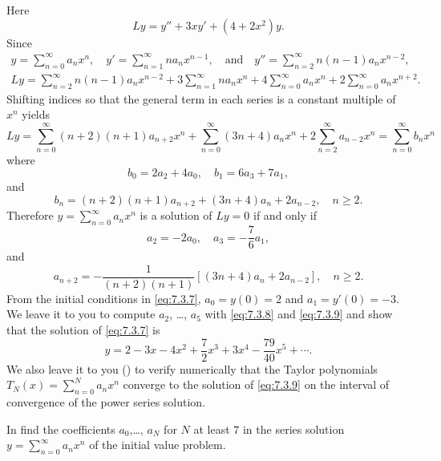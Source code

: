 \begin{solution}
Here
\[
Ly=y''+3xy'+(4+2x^2)y.
\]
Since
\begin{gather*}
y=\sum^\infty_{n=0} a_nx^n,\quad y'=\sum^\infty_{n=1} n
a_nx^{n-1},\quad\text{and}\quad
y''=\sum^\infty_{n=2}n(n-1)a_nx^{n-2},
\\
Ly=\sum^\infty_{n=2}n(n-1)a_nx^{n-2}
+3\sum^\infty_{n=1}na_nx^n+4\sum^\infty_{n=0}a_nx^n+2\sum^\infty_{n=0}
a_nx^{n+2}.
\end{gather*}
Shifting indices so  that the general term in each
series is a constant multiple of $x^n$ yields
\[
Ly=\sum^\infty_{n=0}(n+2)(n+1)a_{n+2}x^n+\sum^\infty_{n=0}(3n+4)a_nx^n
+2\sum^\infty_{n=2}a_{n-2}x^n=\sum_{n=0}^\infty b_nx^n
\]
where
\[
b_0=2a_2+4a_0,\quad b_1=6a_3+7a_1,
\]
and
\[
b_n=(n+2)(n+1)a_{n+2}+(3n+4)a_n+2a_{n-2},\quad n\ge2.
\]
Therefore $y=\sum^\infty_{n=0}a_nx^n$ is a solution of $Ly=0$
if and only if
\begin{equation} \label{eq:7.3.8}
a_2=-2a_0,\quad a_3=-\frac{7}{6}a_1,
\end{equation}
and
\begin{equation} \label{eq:7.3.9}
a_{n+2}=-\frac{1}{(n+2)(n+1)}\left[(3n+4)a_n+2a_{n-2}\right],\quad n\ge2.
\end{equation}
From the initial conditions in \eqref{eq:7.3.7}, $a_0=y(0)=2$ and
$a_1=y'(0)=-3$. We leave it to you to compute $a_2$, \dots, $a_5$ with
 \eqref{eq:7.3.8} and \eqref{eq:7.3.9} and show that the solution of
\eqref{eq:7.3.7} is
\[
y=2-3x-4x^2+\frac{7}{2}x^3+3x^4-\frac{79}{40}x^5+\cdots.
\]
We also leave it to you () to verify numerically
that the Taylor polynomials $T_N(x)=\sum_{n=0}^Na_nx^n$ converge to
the solution of \eqref{eq:7.3.9}  on the interval of
convergence of the power series solution.
\end{solution}

\exercises
 In   find  the coefficients
$a_0$,\dots, $a_N$ for $N$ at least $7$ in the series solution
$y=\sum_{n=0}^\infty a_nx^n$ of the initial value problem.

